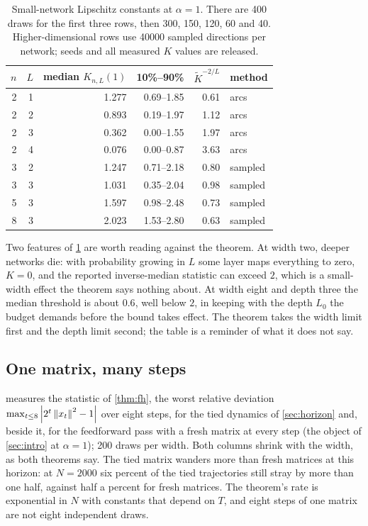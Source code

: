 \begin{table}[h]\centering
\begin{tabular}{rrrrrl}
\toprule
$n$ & $L$ & median $K_{n,L}(1)$ & 10\%--90\% & $\widetilde K^{-2/L}$ & method\\
\midrule
2 & 1 & 1.277 & 0.69--1.85 & 0.61 & arcs\\
2 & 2 & 0.893 & 0.19--1.97 & 1.12 & arcs\\
2 & 3 & 0.362 & 0.00--1.55 & 1.97 & arcs\\
2 & 4 & 0.076 & 0.00--0.87 & 3.63 & arcs\\
3 & 2 & 1.247 & 0.71--2.18 & 0.80 & sampled\\
3 & 3 & 1.031 & 0.35--2.04 & 0.98 & sampled\\
5 & 3 & 1.597 & 0.98--2.48 & 0.73 & sampled\\
8 & 3 & 2.023 & 1.53--2.80 & 0.63 & sampled\\
\bottomrule
\end{tabular}
\caption{Small-network Lipschitz constants at $\alpha=1$. There are 400 draws for the first three rows, then 300, 150, 120, 60 and 40. Higher-dimensional rows use 40000 sampled directions per network; seeds and all measured $K$ values are released.}
\label{tab:small}
\end{table}

Two features of \cref{tab:small} are worth reading against the theorem. At width two, deeper networks die: with probability growing in $L$ some layer maps everything to zero, $K=0$, and the reported inverse-median statistic can exceed $2$, which is a small-width effect the theorem says nothing about. At width eight and depth three the median threshold is about $0.6$, well below $2$, in keeping with the depth $L_0$ the budget demands before the bound takes effect. The theorem takes the width limit first and the depth limit second; the table is a reminder of what it does not say.

\subsection{One matrix, many steps}

 measures the statistic of \cref{thm:fh}, the worst relative deviation $\max_{t\le8}\left\lvert 2^t\left\lVert x_t\right\rVert^2-1\right\rvert$ over eight steps, for the tied dynamics of \cref{sec:horizon} and, beside it, for the feedforward pass with a fresh matrix at every step (the object of \cref{sec:intro} at $\alpha=1$); 200 draws per width. Both columns shrink with the width, as both theorems say. The tied matrix wanders more than fresh matrices at this horizon: at $N=2000$ six percent of the tied trajectories still stray by more than one half, against half a percent for fresh matrices. The theorem's rate is exponential in $N$ with constants that depend on $T$, and eight steps of one matrix are not eight independent draws.

